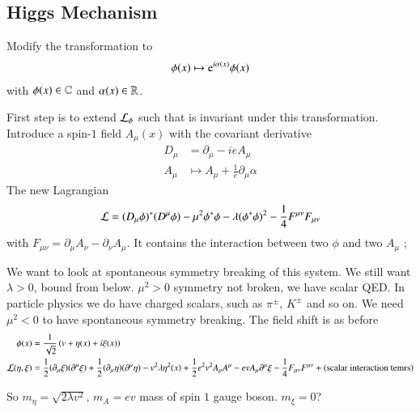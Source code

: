 \subsection{Higgs Mechanism}
Modify the transformation to
\begin{align}
   \phi(x) \mapsto \mathrm{e}^{i\alpha(x)} \phi(x)
\end{align}
with $\phi(x) \in \mathbb{C}$ and $\alpha(x) \in \mathbb{R}$.

First step is to extend $\mathcal{L}_\phi$ such that is invariant under this transformation. Introduce a spin-$1$ field $A_\mu(x)$ with the covariant derivative
\begin{align}
   D_\mu &= \partial_\mu - ieA_\mu \\
   A_\mu &\mapsto A_\mu + \frac{1}{e} \partial_\mu \alpha
\end{align}
The new Lagrangian
\begin{align}
   \mathcal{L} = (D_\mu \phi)^* (D^\mu \phi) - \mu^2 \phi^* \phi - \lambda (\phi^* \phi)^2 - \frac{1}{4} F^{\mu\nu}F_{\mu\nu}
\end{align}
with $F_{\mu\nu}=\partial_\mu A_\nu - \partial_\nu A_\mu$. It contains the interaction between two $\phi$ and two $A_\mu$ ;



We want to look at spontaneous symmetry breaking of this system. We still want $\lambda > 0$, bound from below. $\mu^2 > 0$ symmetry not broken, we have scalar QED. In particle physics we do have charged scalars, such as $\pi^{\pm}$, $K^{\pm}$ and so on. We need $\mu^2 < 0$ to have spontaneous symmetry breaking. The field shift is as before
\begin{align}
   \phi(x) &= \frac{1}{\sqrt{2}} \left( v + \eta (x) + i \xi (x) \right) \\
   \mathcal{L}(\eta, \xi) &= \frac{1}{2} (\partial_\mu \xi) (\partial^\mu \xi) + \frac{1}{2} (\partial_\mu \eta) (\partial^\mu \eta) - v^2 \lambda \eta^2(x) + \frac{1}{2} e^2 v^2 A_\mu A^\mu- ev A_\mu \partial^\mu \xi - \frac{1}{4}F_{\mu\nu}F^{\mu\nu}  + (\text{scalar interaction temrs})
\end{align}

So $m_\eta = \sqrt{2\lambda v^2}$, $m_A = ev$ mass of spin $1$ gauge boson. $m_\xi = 0$?

